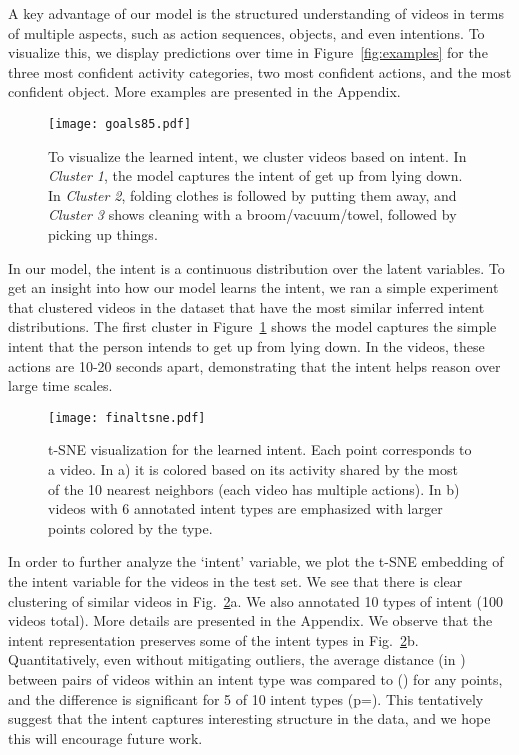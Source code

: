 \documentclass[10pt,twocolumn,letterpaper]{article}
\newcommand{\myparagraph}[1]{\vspace{.3em}\noindent{\bf #1}}
\begin{document}
\myparagraph{Qualitative visualization} A key advantage of our model is the structured understanding of videos in terms of multiple aspects, such as action sequences, objects, and even intentions. 
To visualize this, we display predictions over time in Figure~\ref{fig:examples} for the three most confident activity categories, two most confident actions, and the most confident object. More examples are presented in the Appendix.

\begin{figure}
\centering
\texttt{[image: goals85.pdf]}
\caption{To visualize the learned intent, we cluster videos based on intent. In \emph{Cluster 1}, the model captures the intent of get up from lying down. In \emph{Cluster 2}, folding clothes is followed by putting them away, and \emph{Cluster 3} shows cleaning with a broom/vacuum/towel, followed by picking up things.}
\label{fig:goals}
\end{figure}

\myparagraph{Interpretation of Intent}
In our model, the intent  is a continuous distribution over the latent variables. To get an insight into how our model learns the intent, we ran a simple experiment that clustered videos in the dataset that have the most similar inferred intent distributions. The first cluster in Figure~\ref{fig:goals} shows the model captures the simple intent that the person intends to get up from lying down. In the videos, these actions are 10-20 seconds apart, demonstrating that the intent helps reason over large time scales.

\begin{figure}
\centering
\texttt{[image: finaltsne.pdf]}
\caption{t-SNE visualization for the learned intent. Each point corresponds to a video. In a) it is colored based on its activity shared by the most of the 10 nearest neighbors (each video has multiple actions). In b) videos with 6 annotated intent types are emphasized with larger points colored by the type.}
\label{fig:intentannotations}
\end{figure}

In order to further analyze the `intent' variable, we plot the t-SNE embedding of the intent variable for the videos in the test set. We see that there is clear clustering of similar videos in Fig.~\ref{fig:intentannotations}a. We also annotated 10 types of intent (100 videos total). More details are presented in the Appendix. We observe that the intent representation preserves some of the intent types in Fig.~\ref{fig:intentannotations}b. Quantitatively, even without mitigating outliers, the average distance (in ) between pairs of videos within an intent type was  compared to  () for any points, and the difference is significant for 5 of 10 intent types (p=). This tentatively suggest that the intent captures interesting structure in the data, and we hope this will encourage future work.
\end{document}
